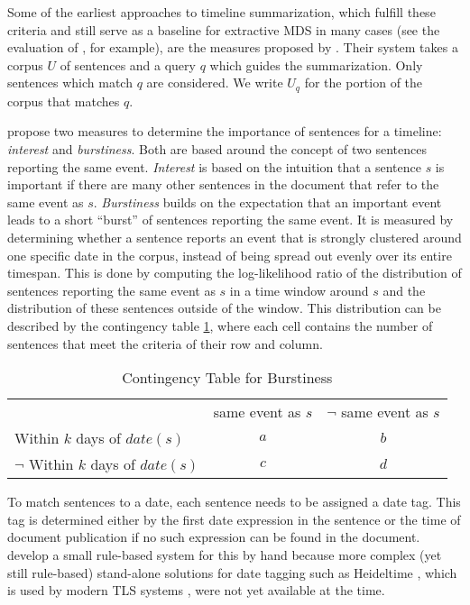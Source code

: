 \documentclass[a4paper,BCOR=10mm]{report}
\numberwithin{lemma}{chapter}
\numberwithin{definition}{chapter}
\begin{document}
Some of the earliest approaches to timeline summarization, which fulfill these criteria and still serve as a baseline for extractive MDS in many cases (see the evaluation of \citet{markert}, for example), are the measures proposed by \citet{chieu}.
Their system takes a corpus $U$ of sentences and a query $q$ which guides the summarization. Only sentences which match $q$ are considered. We write $U_q$ for the portion of the corpus that matches $q$.

\citeauthor{chieu} propose two measures to determine the importance of sentences for a timeline: \textit{interest} and \textit{burstiness}.
Both are based around the concept of two sentences reporting the same event. \textit{Interest} is based on the intuition that a sentence $s$ is important if there are many other sentences in the document that refer to the same event as $s$. \textit{Burstiness} builds on the expectation that an important event leads to a short ``burst'' of sentences reporting the same event.
It is measured by determining whether a sentence reports an event that is strongly clustered around one specific date in the corpus, instead of being spread out evenly over its entire timespan. This is done by computing the log-likelihood ratio of the distribution of sentences reporting the same event as $s$ in a time window around $s$ and the distribution of these sentences outside of the window.
This distribution can be described by the contingency table \ref{tab:chieu}, where each cell contains the number of sentences that meet the criteria of their row and column.

\begin{table}
\centering\begin{tabular}{|l|c|c|}
\hline
& same event as $s$ & $\lnot$ same event as $s$ \\
Within $k$ days of $\mathit{date}(s)$ & $a$ & $b$ \\
$\lnot$ Within $k$ days of $\mathit{date}(s)$ & $c$ & $d$ \\
\hline
\end{tabular}
\caption{Contingency Table for Burstiness}
\label{tab:chieu}
\end{table}

To match sentences to a date, each sentence needs to be assigned a date tag. This tag is determined either by the first date expression in the sentence or the time of document publication if no such expression can be found in the document. \citeauthor{chieu} develop a small rule-based system for this by hand because more complex (yet still rule-based) stand-alone solutions for date tagging such as Heideltime \citep{heideltime}, which is used by modern TLS systems \citep{tran-headlines, markert}, were not yet available at the time.
\end{document}
